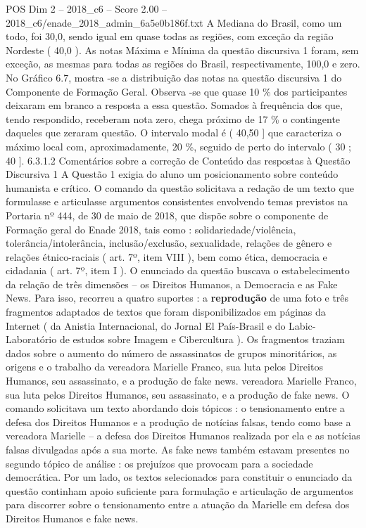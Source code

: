 \begin{textsample}{POS Dim 2 – 2018\_c6 – Score 2.00 – 2018\_c6/enade\_2018\_admin\_6a5e0b186f.txt}
A Mediana do Brasil, como um todo, foi 30,0, sendo igual em quase todas as regiões, com exceção da região Nordeste ( 40,0 ).
As notas Máxima e Mínima da questão discursiva 1 foram, sem exceção, as mesmas para todas as regiões do Brasil, respectivamente, 100,0 e zero.
No Gráfico 6.7, mostra -se a distribuição das notas na questão discursiva 1 do Componente de Formação Geral.
Observa -se que quase 10 \% dos participantes deixaram em branco a resposta a essa questão.
Somados à frequência dos que, tendo respondido, receberam nota zero, chega próximo de 17 \% o contingente daqueles que zeraram questão.
O intervalo modal é ( 40,50 ] que caracteriza o máximo local com, aproximadamente, 20 \%, seguido de perto do intervalo ( 30 ; 40 ]. 6.3.1.2 Comentários sobre a correção de Conteúdo das respostas à Questão Discursiva 1 A Questão 1 exigia do aluno um posicionamento sobre conteúdo humanista e crítico.
O comando da questão solicitava a redação de um texto que formulasse e articulasse argumentos consistentes envolvendo temas previstos na Portaria nº 444, de 30 de maio de 2018, que dispõe sobre o componente de Formação geral do Enade 2018, tais como : solidariedade/violência, tolerância/intolerância, inclusão/exclusão, sexualidade, relações de gênero e relações étnico-raciais ( art. 7º, item VIII ), bem como ética, democracia e cidadania ( art. 7º, item I ).
O enunciado da questão buscava o estabelecimento da relação de três dimensões – os Direitos Humanos, a Democracia e as Fake News.
Para isso, recorreu a quatro suportes : a \textbf{reprodução} de uma foto e três fragmentos adaptados de textos que foram disponibilizados em páginas da Internet ( da Anistia Internacional, do Jornal El País-Brasil e do Labic-Laboratório de estudos sobre Imagem e Cibercultura ).
Os fragmentos traziam dados sobre o aumento do número de assassinatos de grupos minoritários, as origens e o trabalho da vereadora Marielle Franco, sua luta pelos Direitos Humanos, seu assassinato, e a produção de fake news. vereadora Marielle Franco, sua luta pelos Direitos Humanos, seu assassinato, e a produção de fake news.
O comando solicitava um texto abordando dois tópicos : o tensionamento entre a defesa dos Direitos Humanos e a produção de notícias falsas, tendo como base a vereadora Marielle – a defesa dos Direitos Humanos realizada por ela e as notícias falsas divulgadas após a sua morte.
As fake news também estavam presentes no segundo tópico de análise : os prejuízos que provocam para a sociedade democrática.
Por um lado, os textos selecionados para constituir o enunciado da questão continham apoio suficiente para formulação e articulação de argumentos para discorrer sobre o tensionamento entre a atuação da Marielle em defesa dos Direitos Humanos e fake news.

\end{textsample}
